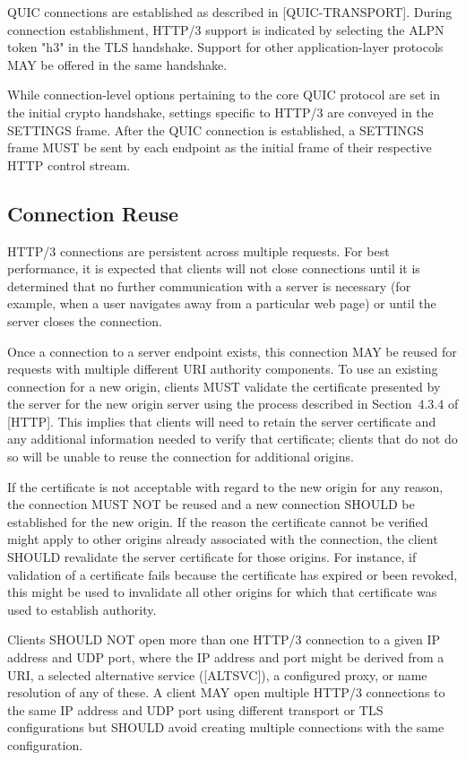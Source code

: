 \documentclass{article}
\begin{document}
QUIC connections are established as described in [QUIC-TRANSPORT]. During connection establishment, HTTP/3 support is indicated by selecting the ALPN token "h3" in the TLS handshake.  Support for other application-layer protocols MAY be offered in the same handshake.

While connection-level options pertaining to the core QUIC protocol are set in the initial crypto handshake, settings specific to HTTP/3 are conveyed in the SETTINGS frame.  After the QUIC connection is established, a SETTINGS frame MUST be sent by each endpoint as the initial frame of their respective HTTP control stream.

\subsection{Connection Reuse}

HTTP/3 connections are persistent across multiple requests.  For best performance, it is expected that clients will not close connections until it is determined that no further communication with a server is necessary (for example, when a user navigates away from a particular web page) or until the server closes the connection.

Once a connection to a server endpoint exists, this connection MAY be reused for requests with multiple different URI authority components. To use an existing connection for a new origin, clients MUST validate the certificate presented by the server for the new origin server using the process described in Section~4.3.4 of [HTTP].  This implies that clients will need to retain the server certificate and any additional information needed to verify that certificate; clients that do not do so will be unable to reuse the connection for additional origins.

If the certificate is not acceptable with regard to the new origin for any reason, the connection MUST NOT be reused and a new connection SHOULD be established for the new origin.  If the reason the certificate cannot be verified might apply to other origins already associated with the connection, the client SHOULD revalidate the server certificate for those origins.  For instance, if validation of a certificate fails because the certificate has expired or been revoked, this might be used to invalidate all other origins for which that certificate was used to establish authority.

Clients SHOULD NOT open more than one HTTP/3 connection to a given IP address and UDP port, where the IP address and port might be derived from a URI, a selected alternative service ([ALTSVC]), a configured proxy, or name resolution of any of these.  A client MAY open multiple HTTP/3 connections to the same IP address and UDP port using different transport or TLS configurations but SHOULD avoid creating multiple connections with the same configuration.
\end{document}
